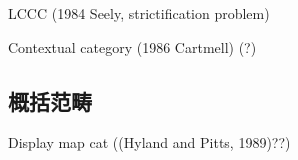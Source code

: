 \begin{comment}
Seely 在 \cite{seely:1984:lccc} 中的重要观察是,
这三个函子对应了依值类型论中重要的三个操作：
\(\Sigma\)-类型, 代入, \(\Pi\)-类型.

我们将每个箭头 \(p : E \to B\) 看作是一族依值类型：
\[x:B \vdash E(x)\,\mathrm{type}\]
这里, 每个 \(E(x)\) 的大致含义就是
原像 \(p^{-1}\{x\}\). 当然, 这只是集合范畴给出的直觉,
一般范畴里不一定有“原像”的概念. 此时如果有一个元素
\(e : 1 \to B\), 那么我们构造拉回
\[\begin{tikzcd}
  {E'} & 1 \\
  E & B
  \arrow[dashed, from=1-1, to=1-2]
  \arrow[from=1-1, to=2-1]
  \arrow["p", from=2-1, to=2-2]
  \arrow["e", from=1-2, to=2-2]
  \arrow["\lrcorner"{anchor=center, pos=0.125}, draw=none, from=1-1, to=2-2]
\end{tikzcd}\]
则此时 \(E'\) 如果在集合的范畴中考虑, 就是
\(p^{-1}\{e\}\). 换句话说, \(e^{*}\) 函子把
\(p : E \to B\) 射到 \(E' \to 1\), 对应类型论中的
\[\vdash E(e) \, \text{type}\]
而对于一般的情况, \(e\) 本身也可能有变量, 即
\(e : A \to B\). 那么这时候得到的就是
\[a : A \vdash E(e(a)) \, \text{type}\]
由此可以看出, 拉回 \(e^*\) 对应的类型论操作
是\emph{代入}. 进一步, 如果有这个箭头 \(p : E \to B\)
表示一族类型 \(x:B \vdash E(x)\),
那么它与 \(\iota : B \to 1\) 进行复合, 得到的
就是全空间 \(E\), 换句话说就是 \(\Sigma\)-类型：
\[\vdash \sum_{x:B}E(x) \, \text{type}\]
因此可见 \(\iota_!\) 函子对应的是取 \(\Sigma\)-类型
的操作. 同样, 如果将 \(1\) 改成一般的对象\(A\), 即有
\(a : A \vdash B(a)\) 类型, 此时有
\[a : A \vdash \sum_{x : B(a)} E(x)\, \text{type}\]
最后, \(\iota_*\) 对应 \(\Pi\)-类型, 与 \(\Sigma\)-类型
是对偶的, 留给读者作为练习.

当然, 这只覆盖了三个构造. 细心的读者可能也有其他的疑惑：
为什么一些箭头被看成依值类型, 而另一些箭头 (比如 \(e\))
被看成元素? 类型论里其他的构造, 比如自然数类型, 宇宙类型
等, 需要如何翻译? 这些问题促使数学家发展了更加细化的
理论. 如今我们有一系列的定义, 各自有细微的差别, 并且
各有优劣. 它们就是依值类型论的\textbf{范畴语义}.

\end{comment}

LCCC (1984 Seely, strictification problem)

Contextual category (1986 Cartmell) (?)

\subsection{概括范畴}

Display map cat ((Hyland and Pitts,
1989)??)

